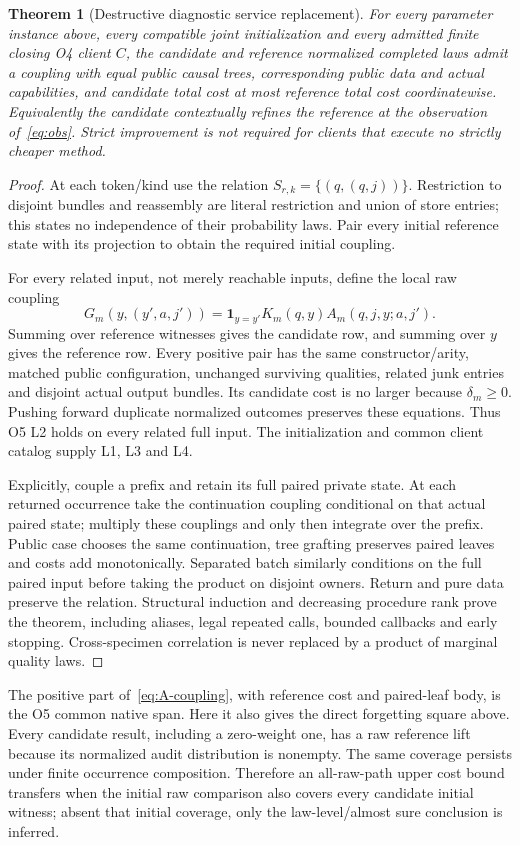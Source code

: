\documentclass[11pt,a4paper]{article}
\newtheorem{theorem}{Theorem}[section]
\theoremstyle{definition}
\begin{document}
\begin{theorem}[Destructive diagnostic service replacement]\label{thm:A}
For every parameter instance above, every compatible joint initialization
and every admitted finite closing O4 client $C$, the candidate and
reference normalized completed laws admit a coupling with equal public
causal trees, corresponding public data and actual capabilities, and
candidate total cost at most reference total cost coordinatewise.
Equivalently the candidate contextually refines the reference at the
observation of~\eqref{eq:obs}. Strict improvement is not required for
clients that execute no strictly cheaper method.
\end{theorem}
\begin{proof}
At each token/kind use the relation
$S_{r,k}=\{(q,(q,j))\}$. Restriction to disjoint bundles and reassembly
are literal restriction and union of store entries; this states no
independence of their probability laws. Pair every initial reference state
with its projection to obtain the required initial coupling.

For every related input, not merely reachable inputs, define the local
raw coupling
\begin{equation}\label{eq:A-coupling}
G_m(y,(y',a,j'))=
\mathbf1_{y=y'}K_m(q,y)A_m(q,j,y;a,j').
\end{equation}
Summing over reference witnesses gives the candidate row, and summing
over $y$ gives the reference row. Every positive pair has the same
constructor/arity, matched public configuration, unchanged surviving
qualities, related junk entries and disjoint actual output bundles.
Its candidate cost is no larger because $\delta_m\geq0$.
Pushing forward duplicate normalized outcomes preserves these equations.
Thus O5 L2 holds on every related full input. The initialization and
common client catalog supply L1, L3 and L4.

Explicitly, couple a prefix and retain its full paired private state.
At each returned occurrence take the continuation coupling conditional
on that actual paired state; multiply these couplings and only then
integrate over the prefix. Public case chooses the same continuation,
tree grafting preserves paired leaves and costs add monotonically.
Separated batch similarly conditions on the full paired input before
taking the product on disjoint owners. Return and pure data preserve
the relation. Structural induction and decreasing procedure rank prove
the theorem, including aliases, legal repeated calls, bounded callbacks
and early stopping. Cross-specimen correlation is never replaced by a
product of marginal quality laws.
\end{proof}
The positive part of~\eqref{eq:A-coupling}, with reference cost and
paired-leaf body, is the O5 common native span. Here it also gives the
direct forgetting square above. Every candidate result, including a
zero-weight one, has a raw reference lift because its normalized audit
distribution is nonempty. The same coverage persists under finite
occurrence composition. Therefore an all-raw-path upper cost bound
transfers when the initial raw comparison also covers every candidate
initial witness; absent that initial coverage, only the law-level/almost
sure conclusion is inferred.
\end{document}
